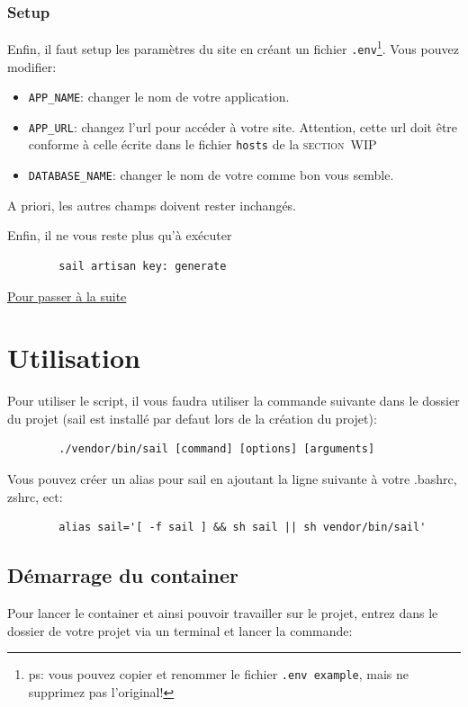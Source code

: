 \documentclass[internal]{nhitec_design}
\begin{document}
    \subsubsection[Setup]{Setup}
    Enfin, il faut setup les paramètres du site en créant un fichier \verb|.env|\footnote{ps: vous pouvez copier et renommer le fichier \verb|.env example|, mais ne supprimez pas l'original!}. Vous pouvez modifier:

    \begin{itemize}
        \item \verb|APP_NAME|: changer le nom de votre application.
        \item \verb|APP_URL|: changez l'url pour accéder à votre site. Attention, cette url doit être conforme à celle écrite dans le fichier \verb|hosts| de la \textsc{section~WIP}
        \item \verb|DATABASE_NAME|: changer le nom de votre \db{} comme bon vous semble.
    \end{itemize}
    A priori, les autres champs doivent rester inchangés.

    Enfin, il ne vous reste plus qu'à exécuter 
    \begin{lstlisting}
        sail artisan key: generate
    \end{lstlisting}

    \hyperref[sec:utilisation]{Pour passer à la suite}

\section[Utilisation]{Utilisation\label{sec:utilisation}}
    Pour utiliser le script, il vous faudra utiliser la commande suivante dans le dossier du projet (sail est installé par defaut lors de la création du projet):

    \begin{lstlisting}
        ./vendor/bin/sail [command] [options] [arguments]
    \end{lstlisting}

    Vous pouvez créer un alias pour sail en ajoutant la ligne suivante à votre .bashrc, zshrc, ect: 

    \begin{lstlisting}
        alias sail='[ -f sail ] && sh sail || sh vendor/bin/sail'
    \end{lstlisting}
    
    \subsection[Démarrage du container]{Démarrage du container}
        Pour lancer le container et ainsi pouvoir travailler sur le projet, entrez dans le dossier de votre projet via un terminal et lancer la commande:
        
\end{document}
